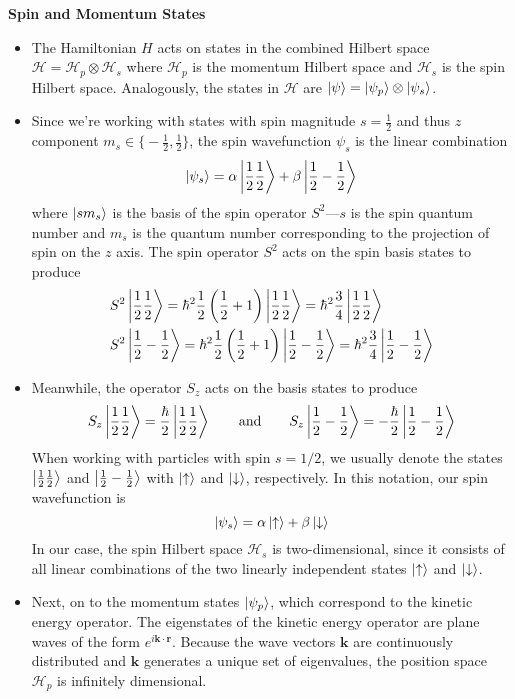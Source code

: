 \documentclass[11pt, a4paper]{article}
\newcommand{\eqtext}[1]{\qquad \text{#1} \qquad}
\renewcommand{\vec}[1]{\bm{#1}} %
\renewcommand{\H}{\mathcal{H}}  %
\newcommand{\ua}{\uparrow}  %
\newcommand{\da}{\downarrow}  %
\begin{document}
\vspace{2mm}
\textbf{Spin and Momentum States}
\begin{itemize}
	\item The Hamiltonian $ H $ acts on states in the combined Hilbert space 
	$ \H = \H_{p}\otimes \H_{s} $ where $ \H_{p} $ is the momentum Hilbert space and $ \H_{s} $ is the spin Hilbert space. Analogously, the states in $ \H $ are $ \ket{\psi} = \ket{\psi_{p}} \otimes \ket{\psi_{s}}$. 
	
	\item Since we're working with states with spin magnitude $ s = \frac{1}{2} $ and thus $ z $ component $ m_{s} \in  \big\{-\tfrac{1}{2}, \tfrac{1}{2}\big\} $, the spin wavefunction $ \psi_{s} $ is the linear combination
	\begin{equation*}
		\ket{\psi_{s}} = \alpha \ket{\frac{1}{2}\frac{1}{2}} + \beta \ket{\frac{1}{2}-\frac{1}{2}}
	\end{equation*}
	where $ \ket{sm_{s}} $ is the basis of the spin operator $ S^{2} $---$ s $ is the spin quantum number and $ m_{s} $ is the quantum number corresponding to the projection of spin on the $ z $ axis. The spin operator $ S^{2} $ acts on the spin basis states to produce
	\begin{align*}
		&S^{2} \ket{\frac{1}{2}\frac{1}{2}} = \hbar^{2} \frac{1}{2}\left(\frac{1}{2} + 1\right ) \ket{\frac{1}{2}\frac{1}{2}} = \hbar^{2} \frac{3}{4} \ket{\frac{1}{2}\frac{1}{2}}\\
		& S^{2} \ket{\frac{1}{2}-\frac{1}{2}} = \hbar^{2} \frac{1}{2}\left (\frac{1}{2} + 1\right ) \ket{\frac{1}{2}-\frac{1}{2}} = \hbar^{2} \frac{3}{4} \ket{\frac{1}{2}-\frac{1}{2}}
	\end{align*}
	
	\item Meanwhile, the operator $ S_{z} $ acts on the basis states to produce
	\begin{equation*}
		S_{z} \ket{\frac{1}{2}\frac{1}{2}} = \frac{\hbar}{2} \ket{\frac{1}{2}\frac{1}{2}} \eqtext{and} S_{z} \ket{\frac{1}{2}-\frac{1}{2}} = -\frac{\hbar}{2} \ket{\frac{1}{2}-\frac{1}{2}}
	\end{equation*}
	When working with particles with spin $ s = 1/2 $, we usually denote the states $  \ket{\frac{1}{2}\frac{1}{2}}  $ and $  \ket{\frac{1}{2}-\frac{1}{2}}  $ with $ \ket{\ua} $ and $ \ket{\da} $, respectively. In this notation, our spin wavefunction is
	\begin{equation*}
		\ket{\psi_{s}} = \alpha \ket{\ua} + \beta \ket{\da}
	\end{equation*}
	In our case, the spin Hilbert space $ \H_{s} $ is two-dimensional, since it consists of all linear combinations of the two linearly independent states $ \ket{\ua} $ and $ \ket{\da} $. 
	
	\item Next, on to the momentum states $ \ket{\psi_{p}} $, which correspond to the kinetic energy operator. The eigenstates of the kinetic energy operator are plane waves of the form $ e^{i\vec{k}\cdot \vec{r}} $. Because the wave vectors $ \vec{k} $ are continuously distributed and $ \vec{k} $ generates a unique set of eigenvalues, the position space $ \H_{p} $ is infinitely dimensional.
\end{itemize}
\end{document}
